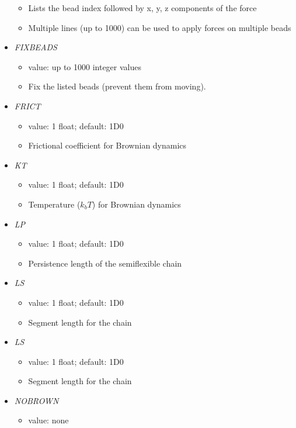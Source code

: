 \documentclass[12pt]{article}
\begin{document}
\begin{itemize}
\begin{itemize}
      \item Lists the bead index followed by x, y, z components of the force
      \item Multiple lines (up to 1000) can be used to apply forces on multiple beads
    \end{itemize}
%    
\item {\it FIXBEADS}
    \begin{itemize}
      \item  value: up to 1000 integer values
      \item Fix the listed beads (prevent them from moving).
    \end{itemize}
%    
\item {\it FRICT}
    \begin{itemize}
      \item  value: 1 float; default: 1D0
      \item Frictional coefficient for Brownian dynamics
    \end{itemize}
%    
\item {\it KT}
    \begin{itemize}
      \item  value: 1 float; default: 1D0
      \item Temperature ($k_b T$) for Brownian dynamics
    \end{itemize}
%    
\item {\it LP}
    \begin{itemize}
      \item  value: 1 float; default: 1D0
      \item Persistence length of the semiflexible chain
    \end{itemize}    
%    
\item {\it LS}
    \begin{itemize}
      \item  value: 1 float; default: 1D0
      \item Segment length for the chain
    \end{itemize}   
%    
\item {\it LS}
    \begin{itemize}
      \item  value: 1 float; default: 1D0
      \item Segment length for the chain
      \end{itemize}
 \item {\it NOBROWN}
     \begin{itemize}
       \item  value: none

\end{itemize}
\end{itemize}
\end{document}
